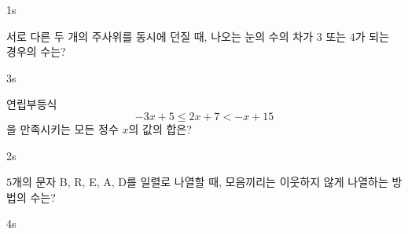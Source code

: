 \documentclass[10pt]{article}
\begin{document}


\setlength{\probboxheight}{65mm}

\begin{pagepair}
\noindent
\begin{minipage}[t][\probboxheight][t]{0.46\linewidth}
\begin{problem}{1}{s}
\par\smallskip
서로 다른 두 개의 주사위를 동시에 던질 때, 나오는 눈의 수의 차가 $3$ 또는 $4$가 되는 경우의 수는?
\begin{choices}
\end{choices}
\end{problem}
\end{minipage}\hfill
\begin{minipage}[t][\probboxheight][t]{0.46\linewidth}
\begin{problem}{3}{s}
\par\smallskip
연립부등식
\[ -3x + 5 \le 2x + 7 < -x + 15 \]
을 만족시키는 모든 정수 $x$의 값의 합은?
\begin{choices}
\end{choices}
\end{problem}
\end{minipage}
\par\vspace{4mm}
\noindent
\begin{minipage}[t][\probboxheight][t]{0.46\linewidth}
\begin{problem}{2}{s}
\par\smallskip
$5$개의 문자 B, R, E, A, D를 일렬로 나열할 때, 모음끼리는 이웃하지 않게 나열하는 방법의 수는?
\begin{choices}
\end{choices}
\end{problem}
\end{minipage}\hfill
\begin{minipage}[t][\probboxheight][t]{0.46\linewidth}
\begin{problem}{4}{s}

\end{problem}
\end{minipage}
\end{pagepair}
\end{document}
